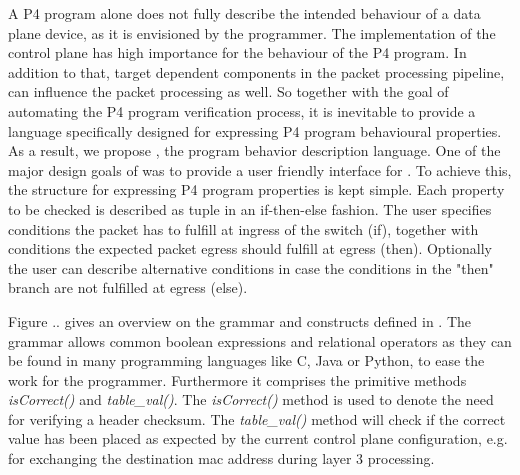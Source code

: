 A P4 program alone does not fully describe the intended behaviour of a data plane device, as it is envisioned by the programmer. The implementation of the control plane has high importance for the behaviour of the P4 program. In addition to that, target dependent components in the packet processing pipeline, can influence the packet processing as well. So together with the goal of automating the P4 program verification process, it is inevitable to provide a language specifically designed for expressing P4 program behavioural properties. 
As a result, we propose \lang, the program behavior description language. One of the major design goals of \lang was to provide a user friendly interface for \system. To achieve this, the structure for expressing P4 program properties is kept simple. Each property to be checked is described as tuple in an if-then-else fashion. The user specifies conditions the packet has to fulfill at ingress of the switch (if), together with conditions the expected packet egress should fulfill at egress (then). Optionally the user can describe alternative conditions in case the conditions in the "then" branch are not fulfilled at egress (else). 

Figure .. gives an overview on the grammar and constructs defined in \lang. The grammar allows common boolean expressions and relational operators as they can be found in many programming languages like C, Java or Python, to ease the work for the programmer. Furthermore it comprises the primitive methods \textit{isCorrect()} and \textit{table\_val()}. The \textit{isCorrect()} method is used to denote the need for verifying a header checksum. The \textit{table\_val()} method will check if the correct value has been placed as expected by the current control plane configuration, e.g. for exchanging the destination mac address during layer 3 processing.



